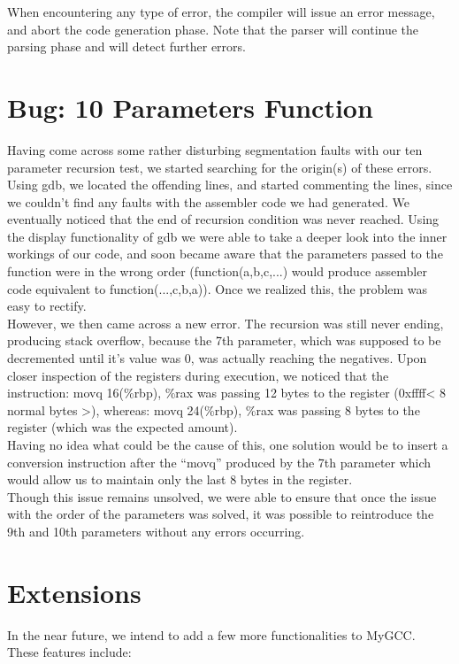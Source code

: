\documentclass{scrartcl}
\begin{document}
When encountering any type of error, the compiler will issue an error message, and abort the code generation phase. Note that the parser will continue the parsing phase and will detect further errors.

\section{Bug: 10 Parameters Function}
Having come across some rather disturbing segmentation faults with our ten parameter recursion test, we started searching for the origin(s) of these errors.\\

Using gdb, we located the offending lines, and started commenting the lines, since we couldn't find any faults with the assembler code we had generated. We eventually noticed that the end of recursion condition was never reached. Using the display functionality of gdb we were able to take a deeper look into the inner workings of our code, and soon became aware that the parameters passed to the function were in the wrong order (function(a,b,c,...) would produce assembler code equivalent to function(...,c,b,a)). Once we realized this, the problem was easy to rectify.\\

However, we then came across a new error. The recursion was still never ending, producing stack overflow, because the 7th parameter, which was supposed to be decremented until it's value was 0, was actually reaching the negatives. Upon closer inspection of the registers during execution, we noticed that the instruction: 
movq 16(\%rbp), \%rax was passing 12 bytes to the register (0xffff< 8 normal bytes >), whereas: 
movq 24(\%rbp), \%rax was passing 8 bytes to the register (which was the expected amount).\\

Having no idea what could be the cause of this, one solution would be to insert a conversion instruction after the “movq” produced by the 7th parameter which would allow us to maintain only the last 8 bytes in the register.\\

Though this issue remains unsolved, we were able to ensure that once the issue with the order of the parameters was solved, it was possible to reintroduce the 9th and 10th parameters without any errors occurring.

\section{Extensions}
In the near future, we intend to add a few more functionalities to MyGCC.\\
These features include:
\end{document}
